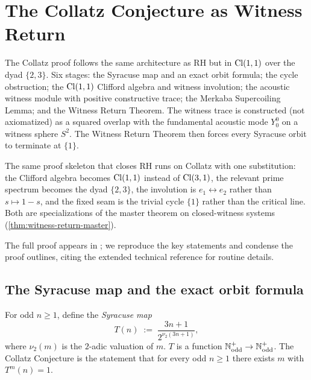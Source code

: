 \section{The Collatz Conjecture as Witness Return}
\label{sec:collatz}

\begin{sectionopener}
The Collatz proof follows the same architecture as RH but in
$\mathrm{Cl}(1,1)$ over the dyad $\{2, 3\}$.  Six stages: the Syracuse map
and an exact orbit formula; the cycle obstruction; the
$\mathrm{Cl}(1,1)$ Clifford algebra and witness involution; the acoustic
witness module with positive constructive trace; the Merkaba
Supercoiling Lemma; and the Witness Return Theorem.  The
witness trace is constructed (not axiomatized) as a squared
overlap with the fundamental acoustic mode $Y_0^0$ on a witness
sphere $S^2$.  The Witness Return Theorem then forces every
Syracuse orbit to terminate at $\{1\}$.
\end{sectionopener}

The same proof skeleton that closes RH runs on Collatz with one
substitution: the Clifford algebra becomes $\mathrm{Cl}(1,1)$ instead of
$\mathrm{Cl}(3,1)$, the relevant prime spectrum becomes the dyad
$\{2, 3\}$, the involution is $e_1 \leftrightarrow e_2$ rather
than $s \mapsto 1 - s$, and the fixed seam is the trivial cycle
$\{1\}$ rather than the critical line.  Both are specializations of
the master theorem on closed-witness systems
(\cref{thm:witness-return-master}).

The full proof appears in \cite[\S 8]{echo-rh}; we reproduce the
key statements and condense the proof outlines, citing the
extended technical reference for routine details.

\subsection{The Syracuse map and the exact orbit formula}

\begin{definition}
\label{def:syracuse-map}
For odd $n \ge 1$, define the \emph{Syracuse map}
\[
  T(n) \;:=\; \frac{3n+1}{2^{\nu_2(3n+1)}},
\]
where $\nu_2(m)$ is the $2$-adic valuation of $m$.  $T$ is a
function $\mathbb{N}^+_{\mathrm{odd}} \to \mathbb{N}^+_{\mathrm{odd}}$.  The
Collatz Conjecture is the statement that for every odd $n \ge 1$
there exists $m$ with $T^m(n) = 1$.
\end{definition}

